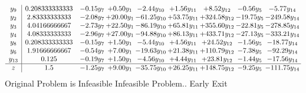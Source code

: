\documentclass[9pt]{article}
\begin{document}
\[\begin{array}{c| c c@{\hskip 2pt} c@{\hskip 2pt} c@{\hskip 2pt} c@{\hskip 2pt} c@{\hskip 2pt} c@{\hskip 2pt} c@{\hskip 2pt} }
 y_{9}   &  0.208333333333 & -0.15 y_{7} & +  0.50 y_{1} & -2.44 y_{10} & +  1.56 y_{11} & +  8.52 y_{12} & -0.56 y_{5} & -5.77 y_{14}\\
 y_{2}   &  2.83333333333 & -2.08 y_{7} & + 20.00 y_{1} & -61.25 y_{10} & + 53.75 y_{11} & + 324.58 y_{12} & -19.75 y_{5} & -249.58 y_{14}\\
 y_{3}   &  4.04166666667 & -2.73 y_{7} & + 22.50 y_{1} & -86.19 y_{10} & + 65.81 y_{11} & + 355.60 y_{12} & -22.81 y_{5} & -278.85 y_{14}\\
 y_{4}   &  4.08333333333 & -2.96 y_{7} & + 27.00 y_{1} & -94.88 y_{10} & + 86.13 y_{11} & + 433.71 y_{12} & -27.13 y_{5} & -333.21 y_{14}\\
 y_{8}   &  0.208333333333 & -0.15 y_{7} & +  1.50 y_{1} & -5.44 y_{10} & +  4.56 y_{11} & + 24.52 y_{12} & -1.56 y_{5} & -18.77 y_{14}\\
 y_{6}   &  1.91666666667 & -0.54 y_{7} & +  7.00 y_{1} & -19.63 y_{10} & + 21.38 y_{11} & + 110.79 y_{12} & -7.38 y_{5} & -92.29 y_{14}\\
 y_{13}   &  0.125 & -0.19 y_{7} & +  1.50 y_{1} & -4.56 y_{10} & +  4.44 y_{11} & + 23.81 y_{12} & -1.44 y_{5} & -17.56 y_{14}\\
\hline
z    &  1.5 & -1.25 y_{7} & +  9.00 y_{1} & -35.75 y_{10} & + 26.25 y_{11} & + 148.75 y_{12} & -9.25 y_{5} & -111.75 y_{14}\\
\end{array}\]
Original Problem is Infeasible
Infeasible Problem.. Early Exit
\end{document}
